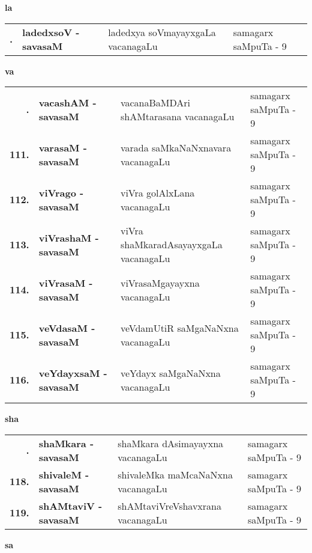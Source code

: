 \medskip

\centerline{\bf la}

{\renewcommand{\arraystretch}{1.3}
\begin{longtable}{>{\bf}r>{\bf}l>{\raggedright}p{8cm}l}
\endfirsthead
\endhead
\endfoot
\endlastfoot
109. &  ladedxsoV - savasaM &  ladedxya soVmayayxgaLa vacanagaLu & samagarx saMpuTa - 9 \\
\end{longtable}}
\smallskip

\centerline{\bf va}

{\renewcommand{\arraystretch}{1.3}
\begin{longtable}{>{\bf}r>{\bf}l>{\raggedright}p{8cm}l}
\endfirsthead
\endhead
\endfoot
\endlastfoot
110. &  vacashAM - savasaM & vacanaBaMDAri shAMtarasana vacanagaLu & samagarx saMpuTa - 9 \\
111. &  varasaM - savasaM &  varada saMkaNaNxnavara vacanagaLu & samagarx saMpuTa - 9 \\
112. &  viVrago - savasaM &  viVra golAlxLana vacanagaLu & samagarx saMpuTa - 9 \\
113. & viVrashaM - savasaM &  viVra shaMkaradAsayayxgaLa vacanagaLu & samagarx saMpuTa - 9 \\
114. & viVrasaM - savasaM & viVrasaMgayayxna vacanagaLu & samagarx saMpuTa - 9 \\
115. & veVdasaM - savasaM &  veVdamUtiR saMgaNaNxna vacanagaLu & samagarx saMpuTa - 9 \\
116. & veYdayxsaM - savasaM &  veYdayx saMgaNaNxna vacanagaLu & samagarx saMpuTa - 9
\end{longtable}}

\newpage

\centerline{\bf sha}

{\renewcommand{\arraystretch}{1.3}
\begin{longtable}{>{\bf}r>{\bf}l>{\raggedright}p{8cm}l}
\endfirsthead
\endhead
\endfoot
\endlastfoot
117. & shaMkara - savasaM &  shaMkara dAsimayayxna vacanagaLu & samagarx saMpuTa - 9 \\
118. & shivaleM - savasaM &  shivaleMka maMcaNaNxna vacanagaLu & samagarx saMpuTa - 9 \\
119. & shAMtaviV - savasaM & shAMtaviVreVshavxrana vacanagaLu & samagarx saMpuTa - 9
\end{longtable}}
\smallskip

\centerline{\bf sa}

